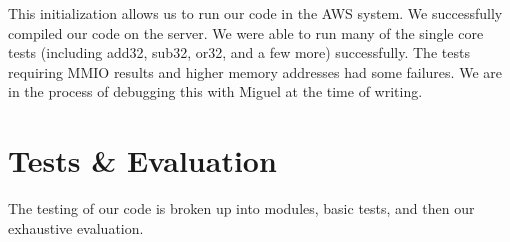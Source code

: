 \documentclass{article}
\begin{document}
This initialization allows us to run our code in the AWS system. We successfully compiled our code on the server. We were able to run many of the single core tests (including add32, sub32, or32, and a few more) successfully. The tests requiring MMIO results and higher memory addresses had some failures.
 We are in the process of debugging this with Miguel at the time of writing. 



\section{Tests \& Evaluation}

The testing of our code is broken up into modules, basic tests, and then our exhaustive evaluation.
\end{document}
